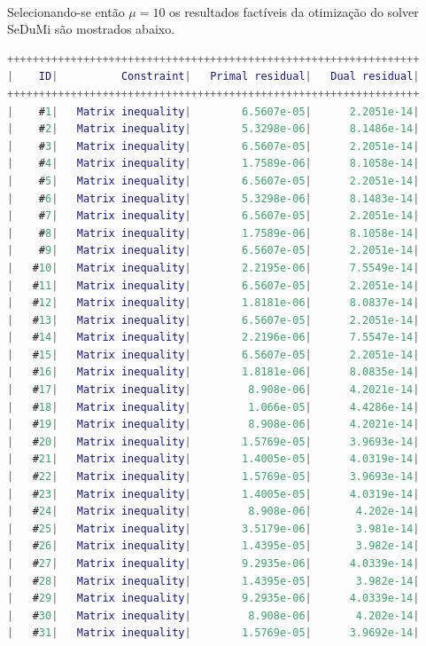 \documentclass[a4paper,10pt]{article}
\begin{document}
\paragraph{}Selecionando-se então $\mu=10$ os resultados factíveis da otimização do solver SeDuMi são mostrados abaixo.
\begin{lstlisting}[language=Matlab]
+++++++++++++++++++++++++++++++++++++++++++++++++++++++++++++++++
|    ID|          Constraint|   Primal residual|   Dual residual|
+++++++++++++++++++++++++++++++++++++++++++++++++++++++++++++++++
|    #1|   Matrix inequality|        6.5607e-05|      2.2051e-14|
|    #2|   Matrix inequality|        5.3298e-06|      8.1486e-14|
|    #3|   Matrix inequality|        6.5607e-05|      2.2051e-14|
|    #4|   Matrix inequality|        1.7589e-06|      8.1058e-14|
|    #5|   Matrix inequality|        6.5607e-05|      2.2051e-14|
|    #6|   Matrix inequality|        5.3298e-06|      8.1483e-14|
|    #7|   Matrix inequality|        6.5607e-05|      2.2051e-14|
|    #8|   Matrix inequality|        1.7589e-06|      8.1058e-14|
|    #9|   Matrix inequality|        6.5607e-05|      2.2051e-14|
|   #10|   Matrix inequality|        2.2195e-06|      7.5549e-14|
|   #11|   Matrix inequality|        6.5607e-05|      2.2051e-14|
|   #12|   Matrix inequality|        1.8181e-06|      8.0837e-14|
|   #13|   Matrix inequality|        6.5607e-05|      2.2051e-14|
|   #14|   Matrix inequality|        2.2196e-06|      7.5547e-14|
|   #15|   Matrix inequality|        6.5607e-05|      2.2051e-14|
|   #16|   Matrix inequality|        1.8181e-06|      8.0835e-14|
|   #17|   Matrix inequality|         8.908e-06|      4.2021e-14|
|   #18|   Matrix inequality|         1.066e-05|      4.4286e-14|
|   #19|   Matrix inequality|         8.908e-06|      4.2021e-14|
|   #20|   Matrix inequality|        1.5769e-05|      3.9693e-14|
|   #21|   Matrix inequality|        1.4005e-05|      4.0319e-14|
|   #22|   Matrix inequality|        1.5769e-05|      3.9693e-14|
|   #23|   Matrix inequality|        1.4005e-05|      4.0319e-14|
|   #24|   Matrix inequality|         8.908e-06|       4.202e-14|
|   #25|   Matrix inequality|        3.5179e-06|       3.981e-14|
|   #26|   Matrix inequality|        1.4395e-05|       3.982e-14|
|   #27|   Matrix inequality|        9.2935e-06|      4.0339e-14|
|   #28|   Matrix inequality|        1.4395e-05|       3.982e-14|
|   #29|   Matrix inequality|        9.2935e-06|      4.0339e-14|
|   #30|   Matrix inequality|         8.908e-06|       4.202e-14|
|   #31|   Matrix inequality|        1.5769e-05|      3.9692e-14|

\end{lstlisting}
\end{document}
